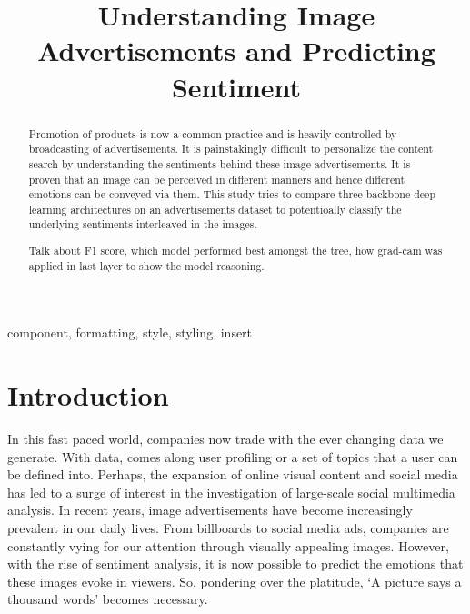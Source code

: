 \documentclass[conference]{IEEEtran}
\begin{document}
\title{Understanding Image Advertisements and Predicting Sentiment\\}

\author{
\and
{}
}

\maketitle

\begin{abstract}
Promotion of products is now a common practice and is heavily controlled by broadcasting of advertisements. It is painstakingly difficult to personalize the content search by understanding the sentiments behind these image advertisements. It is proven that an image can be perceived in different manners and hence different emotions can be conveyed via them. This study tries to compare three backbone deep learning architectures on an advertisements dataset to potentioally classify the underlying sentiments interleaved in the images. 

Talk about F1 score, which model performed best amongst the tree, how grad-cam was applied in last layer to show the model reasoning.
\end{abstract}

\begin{IEEEkeywords}
component, formatting, style, styling, insert
\end{IEEEkeywords}

\section{Introduction}
In this fast paced world, companies now trade with the ever changing data we generate. With data, comes along user profiling or a set of topics that a user can be defined into. Perhaps, the  expansion of online visual content and social media has led to a surge of interest in the investigation of large-scale social multimedia analysis. In recent years, image advertisements have become increasingly prevalent in our daily lives. From billboards to social media ads, companies are constantly vying for our attention through visually appealing images. However, with the rise of sentiment analysis, it is now possible to predict the emotions that these images evoke in viewers. So, pondering over the platitude, `A picture says a thousand words' becomes necessary.
\end{document}
